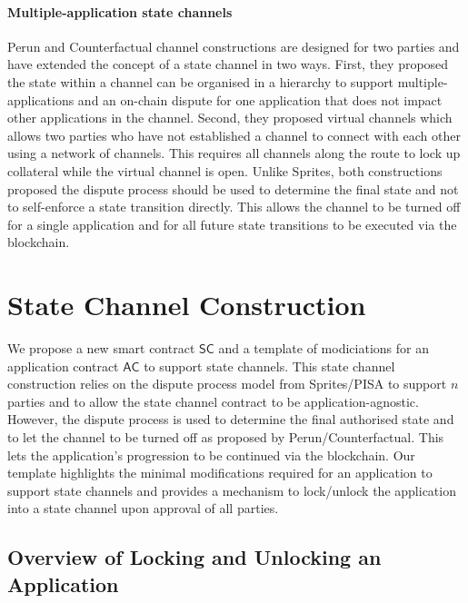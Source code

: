 \documentclass{llncs}
\newcommand{\statechannel}{\mathsf{SC}}
\newcommand{\appcontract}{\mathsf{AC}}
\begin{document}
\paragraph{Multiple-application state channels}
Perun and Counterfactual channel constructions are designed for two parties and have extended the concept of a state channel in two ways. 
First, they proposed the state within a channel can be organised in a hierarchy to support multiple-applications and an on-chain dispute for one application that does not impact other applications in the channel. 
Second, they proposed virtual channels which allows two parties who have not established a channel to connect with each other using a network of channels. 
This requires all channels along the route to lock up collateral while the virtual channel is open. 
Unlike Sprites, both constructions proposed the dispute process should be used to determine the final state and not to self-enforce a state transition directly. 
This allows the channel to be turned off for a single application and for all future state transitions to be executed via the blockchain. 

\section{State Channel Construction} 

We propose a new smart contract $\statechannel$ and a template of modiciations for an application contract $\appcontract$  to support state channels.
This state channel construction relies on the dispute process model from Sprites/PISA to support $n$ parties and to allow the state channel contract to be application-agnostic. 
However, the dispute process is used to determine the final authorised state and to let the channel to be turned off as proposed by Perun/Counterfactual.
This lets the application's progression to be continued via the blockchain.
Our template highlights the minimal modifications required for an application to support state channels and provides a mechanism to lock/unlock the application into a state channel upon approval of all parties. 

\subsection{Overview of Locking and Unlocking an Application}
\end{document}
